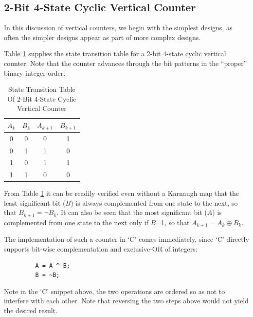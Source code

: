 \subsection{2-Bit 4-State Cyclic Vertical Counter}
\label{cbal0:svct0:stbf0}
In this discussion of vertical counters, we begin with the simplest
designs, as often the simpler designs appear as part of more complex
designs.

Table \ref{tbl:cbal0:svct0:stbf0:01} supplies the state transition table 
for a 2-bit 4-state
cyclic vertical counter.  Note that the counter advances through the
bit patterns in the ``proper'' binary integer order.

\begin{table}
\caption{State Transition Table Of 2-Bit 4-State Cyclic Vertical Counter}
\label{tbl:cbal0:svct0:stbf0:01}
\begin{center}
\begin{tabular}{|c|c|c|c|}
\hline
 $A_k$     & $B_k$     & $A_{k+1}$ & $B_{k+1}$ \\
\hline
\hline
 0         & 0         & 0         & 1         \\
\hline
 0         & 1         & 1         & 0         \\
\hline
 1         & 0         & 1         & 1         \\
\hline
 1         & 1         & 0         & 0         \\
\hline
\end{tabular}
\end{center}
\end{table}

From Table \ref{tbl:cbal0:svct0:stbf0:01} it can be readily verified
even without a Karnaugh map that the least significant bit
($B$) is always complemented from one state to the next, so that
$B_{k+1} = \neg B_k$.  It can also be seen that the most significant
bit ($A$) is complemented from one state to the next only if $B$=1,
so that $A_{k+1} = A_k \oplus B_k$.

The implementation of such a counter in `C' comes immediately, since
`C' directly supports bit-wise complementation and exclusive-OR of
integers:

\begin{verbatim}
         A = A ^ B;
         B = ~B;
\end{verbatim}

Note in the `C' snippet above, the two operations are ordered so as
not to interfere with each other.  Note that reversing the two steps above
would not yield the desired result.


